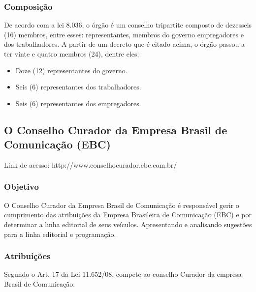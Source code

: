 \subsubsection*{Composição}

De acordo com a lei 8.036, o órgão é um conselho tripartite
composto de dezesseis (16) membros, entre esses: representantes,
membros do governo empregadores e dos trabalhadores. A partir de um
decreto que é citado acima, o órgão passou a ter vinte e quatro
membros (24), dentre eles:

\begin{itemize}
\item 
Doze (12) representantes do governo.
\item 
Seis (6) representantes dos trabalhadores.
\item 
Seis (6) representantes dos empregadores.
\end{itemize}

\newpage
\subsection*{O Conselho Curador da Empresa Brasil de Comunicação (EBC)}

Link de acesso: http://www.conselhocurador.ebc.com.br/

\subsubsection*{Objetivo}

O Conselho Curador da Empresa Brasil de Comunicação é
responsável gerir o cumprimento das atribuições da Empresa
Brasileira de Comunicação (EBC) e por determinar a linha
editorial de seus veículos. Apresentando e analisando sugestões
para a linha editorial e programação.

\subsubsection*{Atribuições}

Segundo o Art. 17 da Lei 11.652/08, compete ao conselho Curador da
empresa Brasil de Comunicação:


